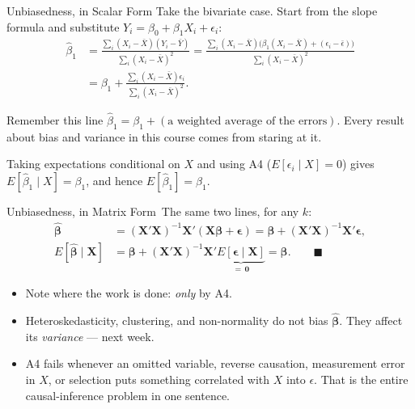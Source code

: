 \documentclass[aspectratio=169,11pt,xcolor=dvipsnames]{beamer}
\newcommand{\E}{E}
\newcommand{\X}{\bm{X}}
\newcommand{\zero}{\bm{0}}
\newcommand{\bhat}{\hat{\bm{\beta}}}
\newcommand{\adv}{\,\raisebox{0.6pt}{\textcolor{accent}{$\bigstar$}}}
\begin{document}
\begin{frame}{Unbiasedness, in Scalar Form}
Take the bivariate case. Start from the slope formula and substitute
$Y_i = \beta_0+\beta_1X_i+\epsilon_i$:
\begin{align*}
  \hat\beta_1
  &= \frac{\sum_i (X_i-\bar X)(Y_i - \bar Y)}{\sum_i (X_i - \bar X)^2}
   = \frac{\sum_i (X_i-\bar X)\big(\beta_1(X_i - \bar X) + (\epsilon_i - \bar\epsilon)\big)}
          {\sum_i (X_i - \bar X)^2} \\[4pt]
  &= \beta_1 + \frac{\sum_i (X_i - \bar X)\epsilon_i}{\sum_i (X_i-\bar X)^2} .
\end{align*}
\pause
\begin{alertblock}{Remember this line}
$\hat\beta_1 = \beta_1 + (\text{a weighted average of the errors})$. Every result
about bias and variance in this course comes from staring at it.
\end{alertblock}
Taking expectations conditional on $X$ and using A4 ($\E[\epsilon_i\mid X]=0$)
gives $\E[\hat\beta_1\mid X]=\beta_1$, and hence $\E[\hat\beta_1]=\beta_1$.
\end{frame}

\begin{frame}{Unbiasedness, in Matrix Form\adv}
The same two lines, for any $k$:
\begin{align*}
  \bhat &= (\X'\X)^{-1}\X'(\X\bm\beta + \bm\epsilon)
         = \bm\beta + (\X'\X)^{-1}\X'\bm\epsilon , \\[4pt]
  \E[\bhat\mid\X] &= \bm\beta + (\X'\X)^{-1}\X'\underbrace{\E[\bm\epsilon\mid\X]}_{=\,\zero}
  = \bm\beta . \qquad\blacksquare
\end{align*}
\vskip6pt
\begin{itemize}
  \item Note where the work is done: \emph{only} by A4.
  \item Heteroskedasticity, clustering, and non-normality do \alert{not} bias
        $\bhat$. They affect its \emph{variance} --- next week.
  \item A4 fails whenever an omitted variable, reverse causation, measurement
        error in $X$, or selection puts something correlated with $X$ into
        $\epsilon$. That is the entire causal-inference problem in one sentence.
\end{itemize}
\end{frame}
\end{document}
